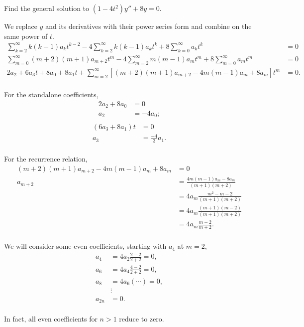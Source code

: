 \documentclass[../hw8]{subfiles}
\begin{document}
Find the general solution to $(1-4t^2)y''+8y=0$.

We replace $y$ and its derivatives with their power series form and combine on the same power of $t$.
\begin{align*}
    \sum\limits_{k=2}^{\infty}k(k-1)a_k t^{k-2}-4 \sum\limits_{k=2}^{\infty}k(k-1)a_k t^k + 8 \sum\limits_{k=0}^{\infty}a_k t^k &= 0 \\
    \sum\limits_{m=0}^{\infty}(m+2)(m+1)a_{m+2}t^m-4 \sum\limits_{m=2}^{\infty}m(m-1)a_m t^m + 8 \sum\limits_{m=0}^{\infty}a_m t^m &= 0 \\
    2a_2+6a_3t+8a_0+8a_1t+\sum\limits_{m=2}^{\infty}\left[ (m+2)(m+1)a_{m+2}-4m(m-1)a_m+8a_m \right]t^m &= 0. \\
\end{align*}

For the standalone coefficients,
\begin{align*}
    2a_2+8a_0&=0\\
    a_2&=-4a_0;\\
\end{align*}
\begin{align*}
    (6a_3+8a_1)t&=0\\
    a_3&=\frac{-4}{3}a_1.\\
\end{align*}

For the recurrence relation,
\begin{align*}
    (m+2)(m+1)a_{m+2}-4m(m-1)a_m+8a_m&=0\\
    a_{m+2}&=\frac{4m(m-1)a_m-8a_m}{(m+1)(m+2)}\\
    &=4a_m\frac{m^2-m-2}{(m+1)(m+2)}\\
    &=4a_m\frac{(m+1)(m-2)}{(m+1)(m+2)}\\
    &=4a_m\frac{m-2}{m+2}.\\
\end{align*}

We will consider some even coefficients, starting with $a_4$ at $m=2$,
\begin{align*}
    a_4&=4a_2\frac{2-2}{2+2}=0,\\
    a_6&=4a_4\frac{4-2}{2+2}=0,\\
    a_8&=4a_6(\cdots)=0,\\
    &\vdots\\
    a_{2n}&=0.\\
\end{align*}

In fact, all even coefficients for $n>1$ reduce to zero.
\end{document}
